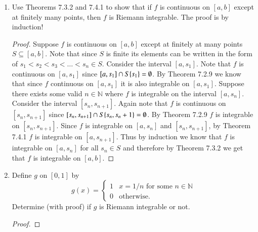\documentclass[12pt]{article}
\makeatletter
\theoremstyle{homework}
\newenvironment{exercise}[1]
{\def\@currentlabel{#1}\exercisecore}
{\endexercisecore}
\newcommand{\Nats}{\ensuremath{\mathbb N}}
\makeatother
\begin{document}
\begin{exercise}{Supplemental 1}
	\vspace{.15in}
\begin{enumerate}
	\item Use Theorems 7.3.2 and 7.4.1 to show that
	if $f$ is continuous on $[a,b]$ except at finitely
	many points, then $f$ is Riemann integrable.  The proof is by 
	induction!\\

	\begin{proof}
		Suppose $f$ is continuous on $[a,b]$ except at finitely at many points $S \subseteq [a,b]$. Note that since $S$ is finite its 
		elements can be written in the form of $s_1 < s_2 < s_3 < \dots < s_n \in S$. Consider the interval $[a, s_1]$. Note that 
		$f$ is continuous on $[a, s_1]$ since $[a,s_1] \cap S\/\{s_1\} = \emptyset$. By Theorem 7.2.9 we know that since $f$ continuous on $[a,s_1]$ it is also integrable on $[a,s_1]$.
		Suppose there exists some valid $n \in \Nats$ where $f$ is integrable on the interval $[a, s_n]$. Consider the interval $[s_n, s_{n+1}]$. Again note that 
		$f$ is continuous on $[s_n, s_{n+1}]$ since $[s_n, s_{n+1}] \cap S\/\{s_n, s_n+1\} = \emptyset$. By Theorem 7.2.9 $f$ is integrable on $[s_n, s_{n+1}]$. Since 
		$f$ is integrable on $[a, s_n]$ and $[s_n, s_{n+1}]$, by Theorem 7.4.1 $f$ is integrable on $[a, s_{n+1}]$. Thus by induction we know that 
		$f$ is integrable on $[a, s_n]$ for all $s_n \in S$ and therefore by Theorem 7.3.2 we get that $f$ is integrable on $[a,b]$.
	\end{proof}
\vspace{.25in}















	\item Define $g$ on $[0,1]$ by
	\[
	g(x) = \begin{cases} 1 & \text{$x=1/n$ for some $n\in\Nats$}\\
	0& \text{otherwise.}
	\end{cases}
	\]
	Determine (with proof) if $g$ is Riemann integrable or not.\\
	\begin{proof}
		

\end{proof}
\end{enumerate}
\end{exercise}
\end{document}
